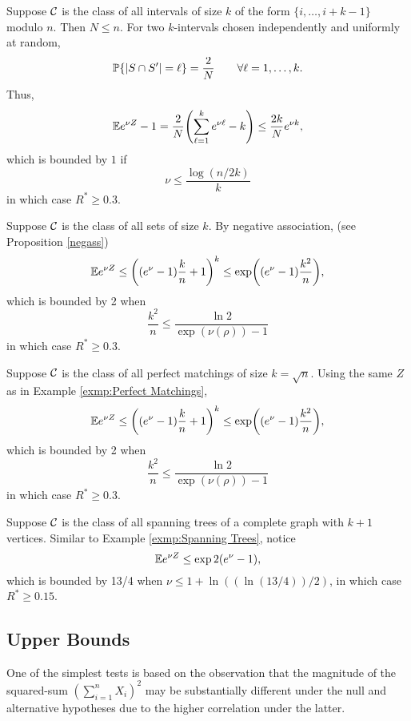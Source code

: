 \documentclass[10pt, oneside]{article}
\begin{document}
\begin{exmp}
  Suppose ${\mathcal C}$ is the class of all intervals of size $k$ of the form $\{i,\ldots, i + k -1\}$ modulo $n$. Then $N \le n$. For two $k$-intervals chosen independently and uniformly at random,
  \[
  \mathbb{P}\{|S \cap S'| = \ell\} = \frac2N\qquad\forall\ell= 1,\ldots, k.
  \]
  Thus,
\[
\mathbb{E} e^{\nu Z}-1 = \frac2N \Biggl(\sum_{\ell=1}^k e^{\nu\ell}
-k\Biggr) \le\frac{2k}N e^{\nu k},
\]
which is bounded by $1$ if $$\nu\le\frac{\log(n/2k)}{k}$$
in which case $R^* \ge0.3$.
\end{exmp}

\begin{exmp}
  Suppose ${\mathcal C}$ is the class of all sets of size $k$. By negative association, (see Proposition \ref{negass})
  \[
  \mathbb{E} e^{\nu Z} \le\biggl((e^\nu-1) \frac{k}{n}+1\biggr)^k
  \le\exp\biggl((e^\nu-1) \frac{k^2}{n}\biggr),
  \]
  which is bounded by 2 when 
  $$\frac{k^2}{n} \le\frac{\ln2}{\exp(\nu(\rho)) -1}$$
  in which case $R^* \ge0.3$.
\end{exmp}

\begin{exmp}
  Suppose ${\mathcal C}$ is the class of all perfect matchings of size $k = \sqrt{n}$. Using the same $Z$ as in Example \ref{exmp:Perfect Matchings},
  \[
  \mathbb{E} e^{\nu Z} \le\biggl((e^\nu-1) \frac{k}{n}+1\biggr)^k
  \le\exp\biggl((e^\nu-1) \frac{k^2}{n}\biggr),
  \]
  which is bounded by 2 when 
  $$\frac{k^2}{n} \le\frac{\ln2}{\exp(\nu(\rho)) -1}$$
  in which case $R^* \ge0.3$.
\end{exmp}

\begin{exmp}
  Suppose ${\mathcal C}$ is the class of all spanning trees of a complete graph with $k+1$ vertices. Similar to Example \ref{exmp:Spanning Trees}, notice
  \[
  \mathbb{E} e^{\nu Z} \le \exp{2(e^\nu-1)},
  \]
  which is bounded by 13/4 when $\nu\le1+\ln((\ln(13/4))/2)$, in which case $R^* \ge0.15$.
\end{exmp}


\subsection{Upper Bounds}
One of the simplest tests is based on the observation that
the magnitude of the squared-sum $(\sum_{i=1}^n X_i)^2$ may be
substantially different under the null and alternative hypotheses due
to the higher correlation under the latter.
\end{document}
